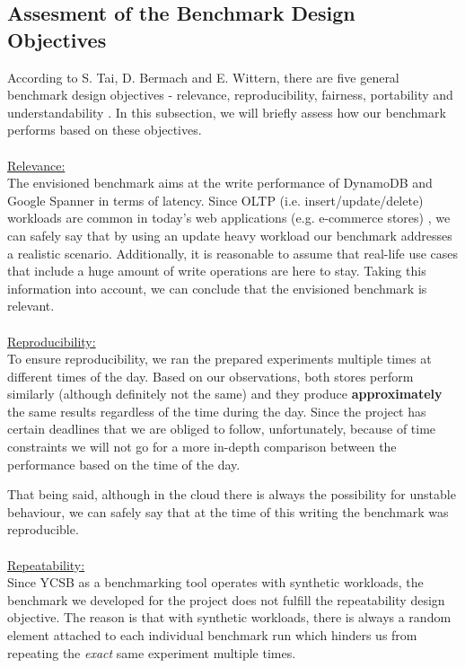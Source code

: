 \documentclass[letterpaper, 10 pt, conference]{ieeeconf}  %
\begin{document}
\subsection{Assesment of the Benchmark Design Objectives}
According to S. Tai, D. Bermach and E. Wittern, there are five general benchmark design objectives - relevance, reproducibility, fairness, portability and understandability \cite{StefanTaiBook}. In this subsection, we will briefly assess how our benchmark performs based on these objectives.
\\
\\
\underline{Relevance:}
\\
The envisioned benchmark aims at the write performance of DynamoDB and Google Spanner in terms of latency. Since OLTP (i.e. insert/update/delete) workloads are common in today's web applications \cite{OLTp} (e.g. e-commerce stores) , we can safely say that by using an update heavy workload our benchmark addresses a realistic scenario. Additionally, it is reasonable to assume that real-life use cases that include a huge amount of write operations are here to stay. Taking this information into account, we can conclude that the envisioned benchmark is relevant.
\\
\\
\underline{Reproducibility:}
\\
To ensure reproducibility, we ran the prepared experiments multiple times at different times of the day. Based on our observations, both stores perform similarly (although definitely not the same) and they produce \textbf{approximately} the same results regardless of the time during the day. Since the project has certain deadlines that we are obliged to follow, unfortunately, because of time constraints we will not go for a more in-depth comparison between the performance based on the time of the day. \par
That being said, although in the cloud there is always the possibility for unstable behaviour, we can safely say that at the time of this writing the benchmark was reproducible.
\\
\\
\underline{Repeatability:}
\\
Since YCSB as a benchmarking tool operates with synthetic workloads, the benchmark we developed for the project does not fulfill the repeatability design objective. The reason is that with synthetic workloads, there is always a random element attached to each individual benchmark run which hinders us from repeating the \textit{exact} same experiment multiple times.
\end{document}
